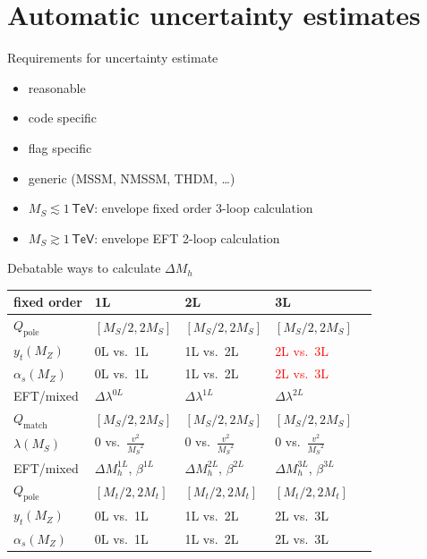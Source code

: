 \documentclass[hyperref={pdfpagelabels=false},ngerman]{beamer}
\newcommand{\eh}[1]{\,\mathsf{#1}}
\newcommand{\MS}{\ensuremath{M_S}}
\newcommand{\pole}{\ensuremath{\text{pole}}}
\begin{document}

\section{Automatic uncertainty estimates}

\begin{frame}{Requirements for uncertainty estimate}
  \begin{itemize}
  \item reasonable
  \item code specific
  \item flag specific
  \item generic (MSSM, NMSSM, THDM, \ldots)
  \item $\MS \lesssim 1\eh{TeV}$: envelope fixed order 3-loop calculation
  \item $\MS \gtrsim 1\eh{TeV}$: envelope EFT 2-loop calculation
  \end{itemize}
\end{frame}

\begin{frame}{Debatable ways to calculate $\Delta M_h$}
  \begin{center}
  \begin{tabular}{lllll}
    \toprule
    fixed order & 1L & 2L & 3L \\
    \midrule
    $Q_\pole$ & $[\MS/2, 2\MS]$ & $[\MS/2, 2\MS]$ & $[\MS/2, 2\MS]$ \\
    $y_t(M_Z)$ & 0L vs.\ 1L & 1L vs.\ 2L & \textcolor{red}{2L vs.\ 3L} \\
    $\alpha_s(M_Z)$ & 0L vs.\ 1L & 1L vs.\ 2L & \textcolor{red}{2L vs.\ 3L} \\
    \midrule
    EFT/mixed & $\Delta\lambda^{0L}$ & $\Delta\lambda^{1L}$ & $\Delta\lambda^{2L}$ \\
    \midrule
    $Q_\text{match}$ & $[\MS/2, 2\MS]$ & $[\MS/2, 2\MS]$ & $[\MS/2, 2\MS]$ \\
    $\lambda(\MS)$ & $0$ vs.\ $\frac{v^2}{\MS^2}$ & $0$ vs.\ $\frac{v^2}{\MS^2}$ & $0$ vs.\ $\frac{v^2}{\MS^2}$ \\
    \midrule
    EFT/mixed & $\Delta M_h^{1L}$, $\beta^{1L}$ & $\Delta M_h^{2L}$, $\beta^{2L}$ & $\Delta M_h^{3L}$, $\beta^{3L}$ \\
    \midrule
    $Q_\pole$ & $[M_t/2, 2M_t]$ & $[M_t/2, 2M_t]$ & $[M_t/2, 2M_t]$ \\
    $y_t(M_Z)$ & 0L vs.\ 1L & 1L vs.\ 2L & 2L vs.\ 3L \\
    $\alpha_s(M_Z)$ & 0L vs.\ 1L & 1L vs.\ 2L & 2L vs.\ 3L \\
    \bottomrule
  \end{tabular}
\end{center}
\end{frame}
\end{document}
